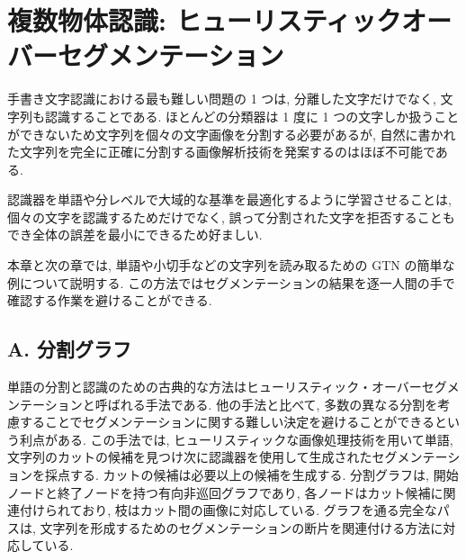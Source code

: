 \documentclass[twocolumn]{jarticle}     %
\begin{document}
\section{複数物体認識: ヒューリスティックオーバーセグメンテーション}
手書き文字認識における最も難しい問題の 1 つは, 分離した文字だけでなく, 文字列も認識することである. ほとんどの分類器は 1 度に 1 つの文字しか扱うことができないため文字列を個々の文字画像を分割する必要があるが, 自然に書かれた文字列を完全に正確に分割する画像解析技術を発案するのはほぼ不可能である.
\par
認識器を単語や分レベルで大域的な基準を最適化するように学習させることは, 個々の文字を認識するためだけでなく, 誤って分割された文字を拒否することもでき全体の誤差を最小にできるため好ましい.
\par
本章と次の章では, 単語や小切手などの文字列を読み取るための GTN の簡単な例について説明する. この方法ではセグメンテーションの結果を逐一人間の手で確認する作業を避けることができる.

\subsection*{A. 分割グラフ}
単語の分割と認識のための古典的な方法はヒューリスティック・オーバーセグメンテーションと呼ばれる手法である.
他の手法と比べて, 多数の異なる分割を考慮することでセグメンテーションに関する難しい決定を避けることができるという利点がある. この手法では, ヒューリスティックな画像処理技術を用いて単語, 文字列のカットの候補を見つけ次に認識器を使用して生成されたセグメンテーションを採点する.
カットの候補は必要以上の候補を生成する.
分割グラフは, 開始ノードと終了ノードを持つ有向非巡回グラフであり, 各ノードはカット候補に関連付けられており, 枝はカット間の画像に対応している. グラフを通る完全なパスは, 文字列を形成するためのセグメンテーションの断片を関連付ける方法に対応している. 
\end{document}
